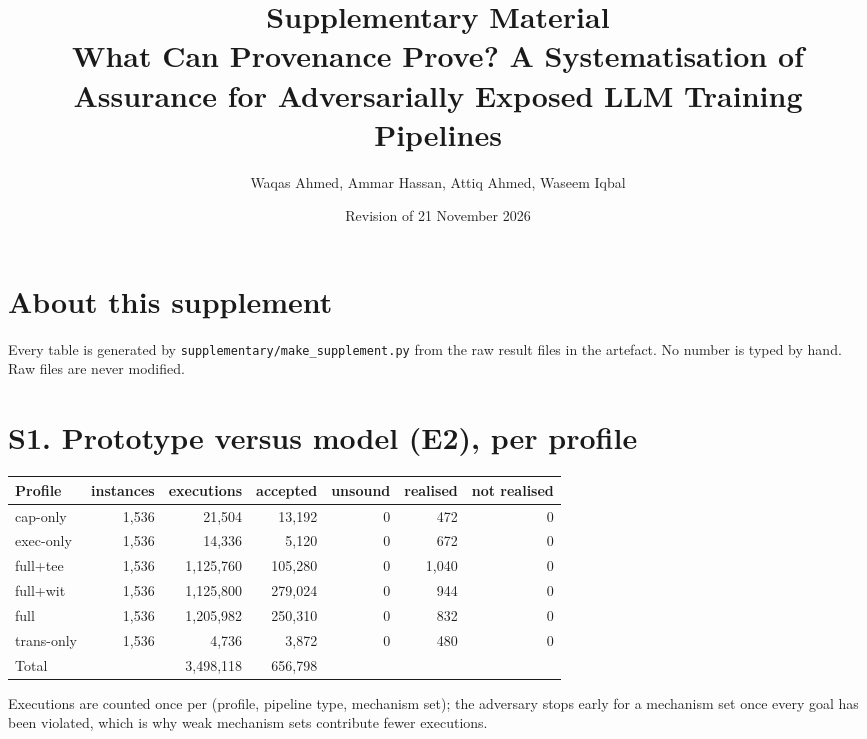 \documentclass[10pt,a4paper]{article}
\title{Supplementary Material\\\large What Can Provenance Prove? A Systematisation of Assurance for Adversarially Exposed LLM Training Pipelines}
\author{Waqas Ahmed, Ammar Hassan, Attiq Ahmed, Waseem Iqbal}\date{Revision of 21 November 2026}
\begin{document}
\maketitle\tableofcontents
\section*{About this supplement}
Every table is generated by \texttt{supplementary/make\_supplement.py} from the raw result files in the artefact.
No number is typed by hand. Raw files are never modified.

\section{S1. Prototype versus model (E2), per profile}
\begin{tabular}{lrrrrrr}\toprule Profile & instances & executions & accepted & unsound & realised & not realised\\\midrule
cap-only & 1,536 & 21,504 & 13,192 & 0 & 472 & 0\\
exec-only & 1,536 & 14,336 & 5,120 & 0 & 672 & 0\\
full+tee & 1,536 & 1,125,760 & 105,280 & 0 & 1,040 & 0\\
full+wit & 1,536 & 1,125,800 & 279,024 & 0 & 944 & 0\\
full & 1,536 & 1,205,982 & 250,310 & 0 & 832 & 0\\
trans-only & 1,536 & 4,736 & 3,872 & 0 & 480 & 0\\
\midrule Total & & 3,498,118 & 656,798 & & & \\\bottomrule\end{tabular}
\par\smallskip Executions are counted once per (profile, pipeline type, mechanism set); the adversary stops early for a mechanism set once every goal has been violated, which is why weak mechanism sets contribute fewer executions.
\end{document}
